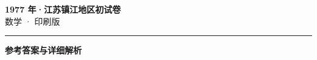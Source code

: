 \documentclass[zihao=5, a4paper]{ctexart}
\begin{document}
\begin{center}
  {\Large\bfseries 1977 年·江苏镇江地区初试卷}\\[4pt]
  {\large 数学 · 印刷版}
\end{center}
\medskip
{}

\par\bigskip\hrule\bigskip
{}
\begin{center}{\large\bfseries 参考答案与详细解析}\end{center}
\smallskip

\end{document}
